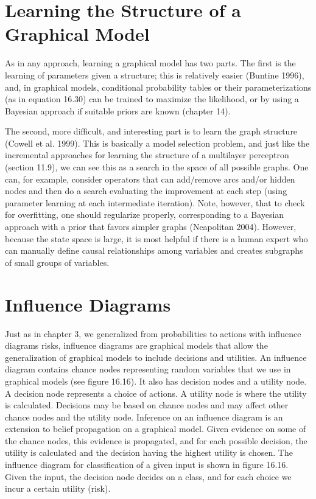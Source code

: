 \section{Learning the Structure of a Graphical Model}

As in any approach, learning a graphical model has two parts. The first is the learning of parameters given a structure; this is relatively easier (Buntine 1996), and, in graphical models, conditional probability tables or their parameterizations (as in equation 16.30) can be trained to maximize the likelihood, or by using a Bayesian approach if suitable priors are known (chapter 14).

The second, more difficult, and interesting part is to learn the graph structure (Cowell et al. 1999). This is basically a model selection problem, and just like the incremental approaches for learning the structure of a multilayer perceptron (section 11.9), we can see this as a search in the space of all possible graphs. One can, for example, consider operators that can add/remove arcs and/or hidden nodes and then do a search evaluating the improvement at each step (using parameter learning at each intermediate iteration). Note, however, that to check for overfitting, one should regularize properly, corresponding to a Bayesian approach with a prior that favors simpler graphs (Neapolitan 2004). However, because the state space is large, it is most helpful if there is a human expert who can manually define causal relationships among variables and creates subgraphs of small groups of variables.

\section{Influence Diagrams}

Just as in chapter 3, we generalized from probabilities to actions with influence diagrams risks, influence diagrams are graphical models that allow the generalization of graphical models to include decisions and utilities. An influence diagram contains chance nodes representing random variables that we use in graphical models (see figure 16.16). It also has decision nodes and a utility node. A decision node represents a choice of actions. A utility node is where the utility is calculated. Decisions may be based on chance nodes and may affect other chance nodes and the utility node. Inference on an influence diagram is an extension to belief propagation on a graphical model. Given evidence on some of the chance nodes, this evidence is propagated, and for each possible decision, the utility is calculated and the decision having the highest utility is chosen. The influence diagram for classification of a given input is shown in figure 16.16. Given the input, the decision node decides on a class, and for each choice we incur a certain utility (risk).


